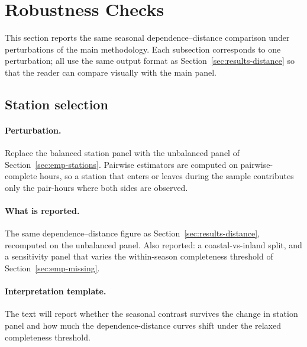 \section{Robustness Checks}\label{sec:robustness}

This section reports the same seasonal dependence--distance
comparison under perturbations of the main methodology. Each
subsection corresponds to one perturbation; all use the same
output format as Section~\ref{sec:results-distance} so that the
reader can compare visually with the main panel.

\subsection{Station selection}\label{sec:rob-stations}

\paragraph{Perturbation.}
Replace the balanced station panel with the unbalanced panel of
Section~\ref{sec:emp-stations}. Pairwise estimators are computed on
pairwise-complete hours, so a station that enters or leaves during
the sample contributes only the pair-hours where both sides are
observed.

\paragraph{What is reported.}
The same dependence--distance figure as
Section~\ref{sec:results-distance}, recomputed on the unbalanced
panel. Also reported: a coastal-vs-inland split, and a sensitivity
panel that varies the within-season completeness threshold of
Section~\ref{sec:emp-missing}.


\paragraph{Interpretation template.}
The text will report whether the seasonal contrast survives the
change in station panel and how much the dependence-distance
curves shift under the relaxed completeness threshold.

